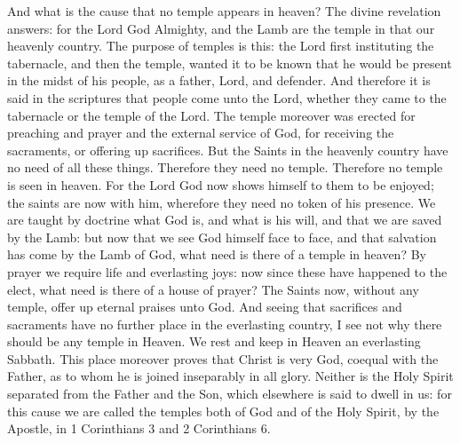 And what is the cause that no temple appears in heaven? The divine revelation answers: for the Lord God Almighty, and the Lamb are the temple in that our heavenly country. The purpose of temples is this: the Lord first instituting the tabernacle, and then the temple, wanted it to be known that he would be present in the midst of his people, as a father, Lord, and defender. And therefore it is said in the scriptures that people come unto the Lord, whether they came to the tabernacle or the temple of the Lord. The temple moreover was erected for preaching and prayer and the external service of God, for receiving the sacraments, or offering up sacrifices. But the Saints in the heavenly country have no need of all these things. Therefore they need no temple. Therefore no temple is seen in heaven. For the Lord God now shows himself to them to be enjoyed; the saints are now with him, wherefore they need no token of his presence. We are taught by doctrine what God is, and what is his will, and that we are saved by the Lamb: but now that we see God himself face to face, and that salvation has come by the Lamb of God, what need is there of a temple in heaven? By prayer we require life and everlasting joys: now since these have happened to the elect, what need is there of a house of prayer? The Saints now, without any temple, offer up eternal praises unto God. And seeing that sacrifices and sacraments have no further place in the everlasting country, I see not why there should be any temple in Heaven. We rest and keep in Heaven an everlasting Sabbath. This place moreover proves that Christ is very God, coequal with the Father, as to whom he is joined inseparably in all glory. Neither is the Holy Spirit separated from the Father and the Son, which elsewhere is said to dwell in us: for this cause we are called the temples both of God and of the Holy Spirit, by the Apostle, in 1 Corinthians 3 and 2 Corinthians 6.

